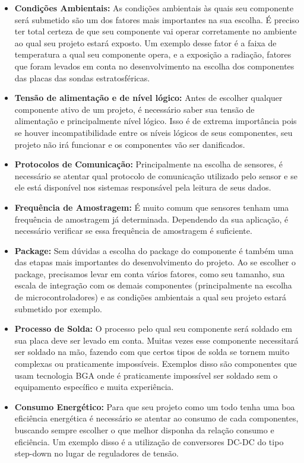 \begin{itemize}
    \item \textbf{Condições Ambientais:}
    As condições ambientais às quais seu componente será submetido são um dos fatores mais importantes na sua escolha. É preciso ter total certeza de que seu componente vai operar corretamente no ambiente ao qual seu projeto estará exposto.  Um exemplo desse fator é a faixa de temperatura a qual seu componente opera, e a exposição a radiação, fatores que foram levados em conta no desenvolvimento na escolha dos componentes das placas das sondas estratosféricas.
    \item \textbf{Tensão de alimentação e de  nível lógico:}
    Antes de escolher qualquer componente ativo de um projeto, é necessário saber sua tensão de alimentação e principalmente nível lógico. Isso é de extrema importância pois se houver incompatibilidade entre os níveis lógicos de seus componentes,  seu projeto  não irá  funcionar e os componentes vão ser danificados.
    \item \textbf{Protocolos de Comunicação:}
    Principalmente na escolha de sensores, é necessário se atentar qual protocolo de comunicação  utilizado pelo sensor e se ele está disponível nos sistemas responsável pela leitura de seus dados.
    \item \textbf{Frequência de Amostragem:}
    É muito comum que sensores tenham uma frequência de amostragem já determinada. Dependendo da sua aplicação, é necessário verificar se essa frequência  de amostragem é suficiente.
    \item \textbf{Package:}
    Sem dúvidas a escolha do package do componente é também uma das etapas mais importantes do desenvolvimento do projeto. Ao se escolher o package, precisamos levar em conta vários fatores, como seu tamanho, sua escala de integração com os demais componentes (principalmente na escolha de microcontroladores) e as condições ambientais  a qual seu projeto estará submetido por exemplo.
    \item \textbf{Processo de Solda:}
    O processo pelo qual seu componente será soldado em sua placa deve ser levado em conta. Muitas vezes esse componente necessitará ser soldado na mão, fazendo com que certos tipos de solda se tornem muito complexas ou praticamente impossíveis. Exemplos disso são componentes que usam tecnologia BGA onde é praticamente impossível ser soldado sem o equipamento específico e muita experiência.
    \item \textbf{Consumo Energético:}
    Para que seu projeto como um todo tenha uma boa eficiência energética é necessário se atentar ao consumo de cada componentes, buscando sempre escolher o que melhor disponha da relação consumo e eficiência. Um exemplo disso é a utilização de conversores DC-DC do tipo step-down no lugar de reguladores de tensão.

\end{itemize}
